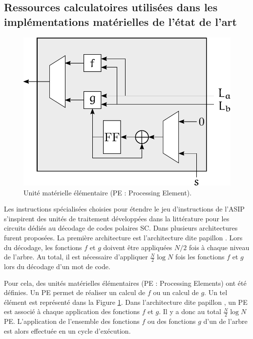 \subsection{Ressources calculatoires utilisées dans les implémentations matérielles de l'état de l'art}
\label{subsec:hard_sc}

\begin{figure}[t]
\centering
\includegraphics[scale=0.75]{main/ch3_fig/PE}
\caption{Unité matérielle élémentaire (PE : Processing Element).}
\label{fig:pe}
\end{figure}


Les instructions spécialisées choisies pour étendre le jeu d'instructions de l'ASIP s'inspirent des unités de traitement développées dans la littérature pour les circuits dédiés au décodage de codes polaires SC. Dans \cite{leroux_hardware_2011} plusieurs architectures furent proposées. La première architecture est l'architecture dite \og papillon \fg. Lors du décodage, les fonctions $f$ et $g$ doivent être appliquées $N/2$ fois à chaque niveau de l'arbre. Au total, il est nécessaire d'appliquer $\frac{N}{2} \log N$ fois les fonctions $f$ et $g$ lors du décodage d'un mot de code. 

Pour cela, des unités matérielles élémentaires (PE : Processing Elements) ont été définies.
Un PE permet de réaliser un calcul de $f$ ou un calcul de $g$. Un tel élément est représenté dans la Figure \ref{fig:pe}.
Dans l'architecture dite \og papillon \fg, un PE est associé à chaque application des fonctions $f$ et $g$.
Il y a donc au total $\frac{N}{2} \log N$ PE.
L'application de l'ensemble des fonctions $f$ ou des fonctions $g$ d'un \noeud de l'arbre est alors effectuée en un cycle d'exécution.

